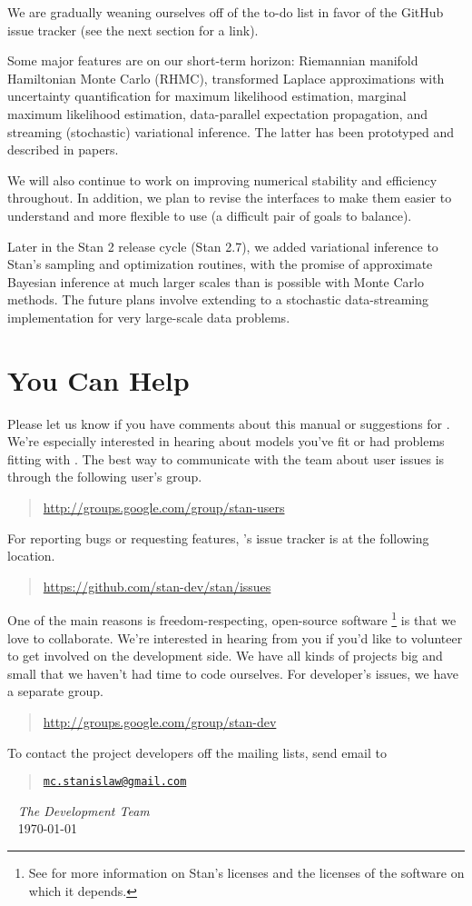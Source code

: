 %
We are gradually weaning ourselves off of the to-do list in favor of
the GitHub issue tracker (see the next section for a link).

Some major features are on our short-term horizon: Riemannian manifold
Hamiltonian Monte Carlo (RHMC), transformed Laplace approximations
with uncertainty quantification for maximum likelihood estimation,
marginal maximum likelihood estimation, data-parallel expectation
propagation, and streaming (stochastic) variational inference.  The
latter has been prototyped and described in papers. 

We will also continue to work on improving numerical stability and
efficiency throughout.  In addition, we plan to revise the interfaces
to make them easier to understand and more flexible to use (a
difficult pair of goals to balance).

Later in the Stan 2 release cycle (Stan 2.7), we added variational
inference to Stan's sampling and optimization routines, with the
promise of approximate Bayesian inference at much larger scales than
is possible with Monte Carlo methods.  The future plans involve
extending to a stochastic data-streaming implementation for very
large-scale data problems.



\section*{You Can Help}

Please let us know if you have comments about this manual or
suggestions for \Stan.  We're especially interested in hearing about
models you've fit or had problems fitting with \Stan.  The best way to
communicate with the \Stan team about user issues is through the
following user's group.
%
\begin{quote}
\url{http://groups.google.com/group/stan-users}
\end{quote}
%
For reporting bugs or requesting features, \Stan's issue tracker is at
the following location.
%
\begin{quote}
\url{https://github.com/stan-dev/stan/issues}
\end{quote}

One of the main reasons \Stan is freedom-respecting, open-source
software%
%
\footnote{See  for more information on Stan's
  licenses and the licenses of the software on which it depends.}
%
is that we love to collaborate.  We're interested in hearing
from you if you'd like to volunteer to get involved on the development
side.  We have all kinds of projects big and small that we haven't had
time to code ourselves.  For developer's issues, we have a separate
group.
%
\begin{quote}
\url{http://groups.google.com/group/stan-dev}
\end{quote}

To contact the project developers off the mailing lists, send email to
\begin{quote}
\href{mailto:mc.stanislaw@gmail.com}{\nolinkurl{mc.stanislaw@gmail.com}}
\end{quote}

\vspace*{12pt}
\mbox{ } \hfill {\it The \Stan Development Team}
\\
\mbox{ } \hfill \today
